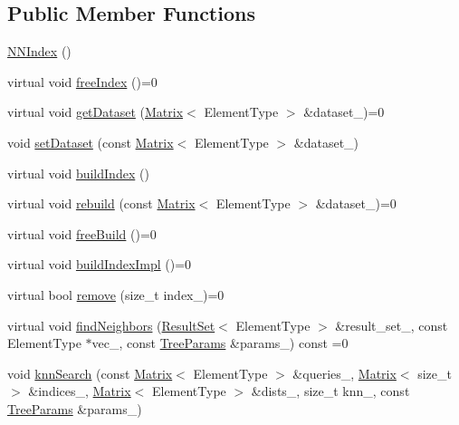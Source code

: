 \subsection*{Public Member Functions}
\begin{DoxyCompactItemize}
\item 
\hyperlink{classtrees_1_1_n_n_index_ae314d8a7c8c0db0eaf22b667b4b4a14e}{N\+N\+Index} ()
\item 
virtual void \hyperlink{classtrees_1_1_n_n_index_afc6b99a8f2693e8b446fc6697dac9f0d}{free\+Index} ()=0
\item 
virtual void \hyperlink{classtrees_1_1_n_n_index_ab209928ad7cf136a482563720d29e2c4}{get\+Dataset} (\hyperlink{classtrees_1_1_matrix}{Matrix}$<$ Element\+Type $>$ \&dataset\+\_\+)=0
\item 
void \hyperlink{classtrees_1_1_n_n_index_a0f02fa0888a3c93b38465ccd37517ba1}{set\+Dataset} (const \hyperlink{classtrees_1_1_matrix}{Matrix}$<$ Element\+Type $>$ \&dataset\+\_\+)
\item 
virtual void \hyperlink{classtrees_1_1_n_n_index_ad8db1182322eba8c1f68ce250e45a36c}{build\+Index} ()
\item 
virtual void \hyperlink{classtrees_1_1_n_n_index_a9efac2e6c3e03ff2cb3f2bd6cacdb3b7}{rebuild} (const \hyperlink{classtrees_1_1_matrix}{Matrix}$<$ Element\+Type $>$ \&dataset\+\_\+)=0
\item 
virtual void \hyperlink{classtrees_1_1_n_n_index_a79c8c1c6ffd00422b97e9df49ff39ec6}{free\+Build} ()=0
\item 
virtual void \hyperlink{classtrees_1_1_n_n_index_a3a280e25b04449f34c4ed0fcc419e7b1}{build\+Index\+Impl} ()=0
\item 
virtual bool \hyperlink{classtrees_1_1_n_n_index_a40d27e58adabc2f21704b9343d85a880}{remove} (size\+\_\+t index\+\_\+)=0
\item 
virtual void \hyperlink{classtrees_1_1_n_n_index_af48da46453e78744d8874c529e06b5ff}{find\+Neighbors} (\hyperlink{classtrees_1_1_result_set}{Result\+Set}$<$ Element\+Type $>$ \&result\+\_\+set\+\_\+, const Element\+Type $\ast$vec\+\_\+, const \hyperlink{structtrees_1_1_tree_params}{Tree\+Params} \&params\+\_\+) const =0
\item 
void \hyperlink{classtrees_1_1_n_n_index_abf4572754ebd83300ab7c7747be10752}{knn\+Search} (const \hyperlink{classtrees_1_1_matrix}{Matrix}$<$ Element\+Type $>$ \&queries\+\_\+, \hyperlink{classtrees_1_1_matrix}{Matrix}$<$ size\+\_\+t $>$ \&indices\+\_\+, \hyperlink{classtrees_1_1_matrix}{Matrix}$<$ Element\+Type $>$ \&dists\+\_\+, size\+\_\+t knn\+\_\+, const \hyperlink{structtrees_1_1_tree_params}{Tree\+Params} \&params\+\_\+)

\end{DoxyCompactItemize}
